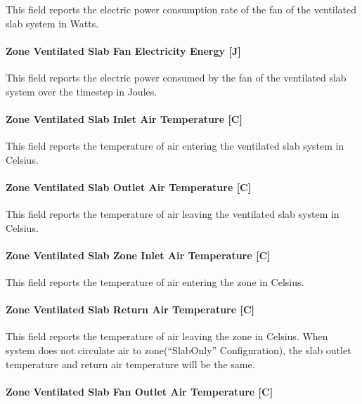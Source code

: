 This field reports the electric power consumption rate of the fan of the ventilated slab system in Watts.

\paragraph{Zone Ventilated Slab Fan Electricity Energy {[}J{]}}\label{zone-ventilated-slab-fan-electric-energy-j}

This field reports the electric power consumed by the fan of the ventilated slab system over the timestep in Joules.

\paragraph{Zone Ventilated Slab Inlet Air Temperature {[}C{]}}\label{zone-ventilated-slab-inlet-air-temperature-c}

This field reports the temperature of air entering the ventilated slab system in Celsius.

\paragraph{Zone Ventilated Slab Outlet Air Temperature {[}C{]}}\label{zone-ventilated-slab-outlet-air-temperature-c}

This field reports the temperature of air leaving the ventilated slab system in Celsius.

\paragraph{Zone Ventilated Slab Zone Inlet Air Temperature {[}C{]}}\label{zone-ventilated-slab-zone-inlet-air-temperature-c}

This field reports the temperature of air entering the zone in Celsius.

\paragraph{Zone Ventilated Slab Return Air Temperature {[}C{]}}\label{zone-ventilated-slab-return-air-temperature-c}

This field reports the temperature of air leaving the zone in Celsius. When system does not circulate air to zone(``SlabOnly'' Configuration), the slab outlet temperature and return air temperature will be the same.

\paragraph{Zone Ventilated Slab Fan Outlet Air Temperature {[}C{]}}\label{zone-ventilated-slab-fan-outlet-air-temperature-c}

